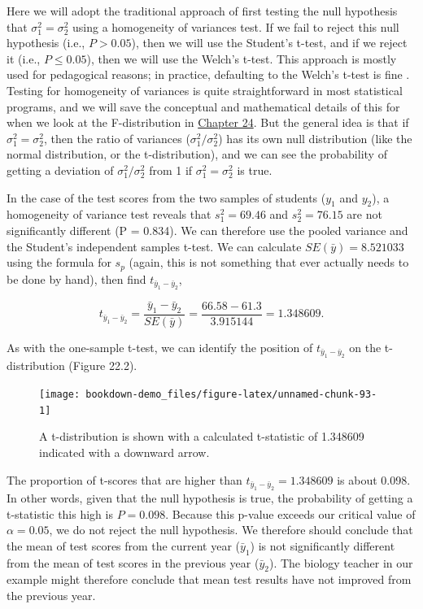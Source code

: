 \documentclass[
]{scrbook}
\begin{document}
Here we will adopt the traditional approach of first testing the null hypothesis that \(\sigma^{2}_{1} = \sigma^{2}_{2}\) using a homogeneity of variances test.
If we fail to reject this null hypothesis (i.e., \(P > 0.05\)), then we will use the Student's t-test, and if we reject it (i.e., \(P \leq 0.05\)), then we will use the Welch's t-test.
This approach is mostly used for pedagogical reasons; in practice, defaulting to the Welch's t-test is fine \citep{Ruxton2006, Delacre2017}.
Testing for homogeneity of variances is quite straightforward in most statistical programs, and we will save the conceptual and mathematical details of this for when we look at the F-distribution in \protect\hyperlink{Chapter_24}{Chapter 24}.
But the general idea is that if \(\sigma^{2}_{1} = \sigma^{2}_{2}\), then the ratio of variances (\(\sigma^{2}_{1}/\sigma^{2}_{2}\)) has its own null distribution (like the normal distribution, or the t-distribution), and we can see the probability of getting a deviation of \(\sigma^{2}_{1}/\sigma^{2}_{2}\) from 1 if \(\sigma^{2}_{1} = \sigma^{2}_{2}\) is true.

In the case of the test scores from the two samples of students (\(y_{1}\) and \(y_{2}\)), a homogeneity of variance test reveals that \(s^{2}_{1} = 69.46\) and \(s^{2}_{2} = 76.15\) are not significantly different (P = 0.834).
We can therefore use the pooled variance and the Student's independent samples t-test.
We can calculate \(SE(\bar{y}) = 8.521033\) using the formula for \(s_{p}\) (again, this is not something that ever actually needs to be done by hand), then find \(t_{\bar{y}_{1} - \bar{y}_{2}}\),

\[t_{\bar{y}_{1} - \bar{y}_{2}} = \frac{\bar{y}_{1} - \bar{y}_{2}}{SE(\bar{y})} = \frac{66.58 - 61.3}{3.915144} = 1.348609.\]

As with the one-sample t-test, we can identify the position of \(t_{\bar{y}_{1} - \bar{y}_{2}}\) on the t-distribution (Figure 22.2).

\begin{figure}
\texttt{[image: bookdown-demo\_files/figure-latex/unnamed-chunk-93-1]} \caption{A t-distribution is shown with a calculated t-statistic of 1.348609 indicated with a downward arrow.}\label{fig:unnamed-chunk-93}
\end{figure}

The proportion of t-scores that are higher than \(t_{\bar{y}_{1} - \bar{y}_{2}} = 1.348609\) is about 0.098.
In other words, given that the null hypothesis is true, the probability of getting a t-statistic this high is \(P = 0.098\).
Because this p-value exceeds our critical value of \(\alpha = 0.05\), we do not reject the null hypothesis.
We therefore should conclude that the mean of test scores from the current year (\(\bar{y}_{1}\)) is not significantly different from the mean of test scores in the previous year (\(\bar{y}_{2}\)).
The biology teacher in our example might therefore conclude that mean test results have not improved from the previous year.
\end{document}
